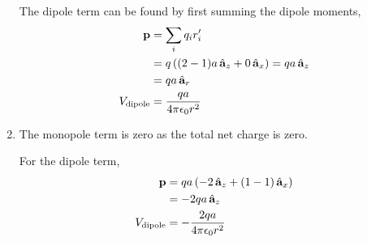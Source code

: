 \documentclass{homework}
\begin{document}
\begin{enumerate}
		The dipole term can be found by first summing the dipole moments, \begin{align*}
			\boldsymbol{\mathrm{p}} & = \sum_i q_i r_i' \\
				& = q \left( (2 - 1)a\thinspace\hat{ \mathbf{a}}_{z} + 0 \thinspace\hat{ \mathbf{a}}_{x} \right) = qa \thinspace\hat{ \mathbf{a}}_{z} \\
				& = qa \thinspace\hat{ \mathbf{a}}_{r} \\
			V_\mathrm{dipole} & = \frac{qa}{4 \pi \epsilon_0 r^2}
		\end{align*}
		
		\item The monopole term is zero as the total net charge is zero.
		
		For the dipole term, \begin{align*}
			\boldsymbol{\mathrm{p}} & = qa \left( -2\thinspace\hat{ \mathbf{a}}_{z} + (1 - 1) \thinspace\hat{ \mathbf{a}}_{x} \right) \\
				& = -2qa \thinspace\hat{ \mathbf{a}}_{z} \\
			V_\mathrm{dipole} & = -\frac{2qa}{4 \pi \epsilon_0 r^2}
		\end{align*}
	\end{enumerate}
\end{document}
